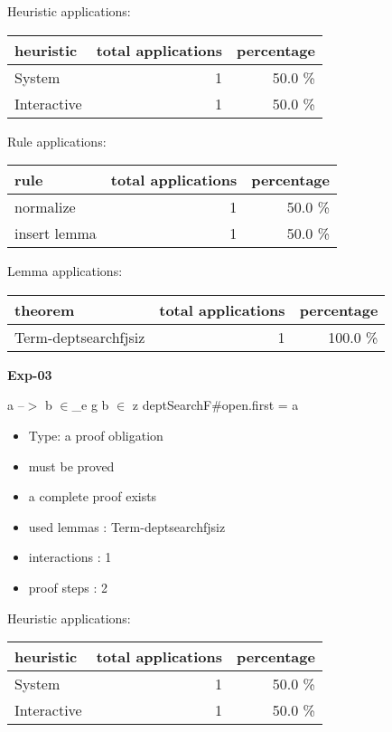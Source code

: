 \documentclass[a4paper]{article}
\begin{document}
\medskip


Heuristic applications:

\begin{supertabular}{l|r|r}
heuristic	& total applications & percentage \\ \hline
System & 1 & 50.0 \% \\
Interactive & 1 & 50.0 \% \\

\end{supertabular}

Rule applications:

\begin{supertabular}{l|r|r}
rule	        & total applications & percentage \\ \hline
normalize & 1 & 50.0 \% \\
insert lemma & 1 & 50.0 \% \\

\end{supertabular}

Lemma applications:

\begin{supertabular}{l|r|r}
theorem	        & total applications & percentage \\ \hline
Term-deptsearchfjsiz & 1 & 100.0 \% \\

\end{supertabular}
\pagebreak

{\LARGE\bf Exp-03}\label{lemma-Exp-03}

\medskip

 \Fol a --$>$ b $\in$\_e g \And b $\in$ z \Imp \Do deptSearchF\#\Dc open.first = a

\begin{itemize}

\item Type: a proof obligation

\item       must be proved
\item       a complete proof exists
\item       used lemmas  : Term-deptsearchfjsiz
\item       interactions : 1
\item       proof steps  : 2
\end{itemize}

\medskip


Heuristic applications:

\begin{supertabular}{l|r|r}
heuristic	& total applications & percentage \\ \hline
System & 1 & 50.0 \% \\
Interactive & 1 & 50.0 \% \\

\end{supertabular}
\end{document}
